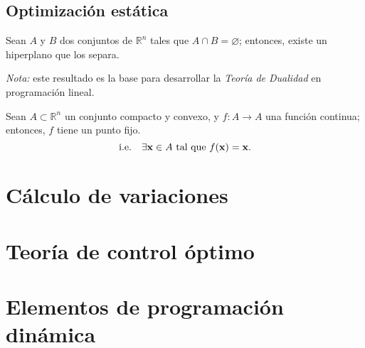\documentclass[8pt,a4paper]{extarticle}
\begin{document}
\begin{multicols}{3}
	\subsection{Optimización estática}

	\begin{boxtheo}[Minkowski]
		Sean $A$ y $B$ dos conjuntos de $\mathbb{R}^n$ tales que $A \cap B = \varnothing$; entonces, existe un hiperplano que los separa.
	\end{boxtheo}

	\emph{Nota:} este resultado es la base para desarrollar la \emph{Teoría de Dualidad} en programación lineal.

	\begin{boxtheo}
		Sean $A \subset \mathbb{R}^n$ un conjunto compacto y convexo, y $f : A \to A$ una función continua; entonces, $f$ tiene un punto fijo.
		\[
			\text{\normalfont i.e.} \quad \exists \mathbf{x} \in A \text{ tal que } f(\mathbf{x}) = \mathbf{x}.
		\]
	\end{boxtheo}

	\newpage

	\section{Cálculo de variaciones}

	\newpage

	\section{Teoría de control óptimo}

	\newpage

	\section{Elementos de programación dinámica}

	\vfill\eject
	\columnbreak
\end{multicols}
\end{document}
